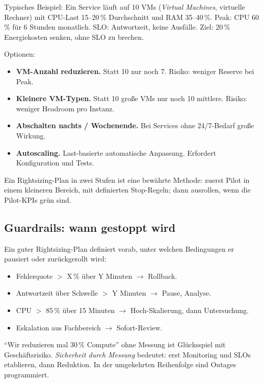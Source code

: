 \documentclass[11pt,a4paper,oneside]{article}
\begin{document}
Typisches Beispiel: Ein Service läuft auf 10 VMs (\emph{Virtual Machines}, virtuelle Rechner) mit CPU-Last 15--20\,\% Durchschnitt und RAM 35--40\,\%. Peak: CPU 60\,\% für 6 Stunden monatlich. SLO: Antwortzeit, keine Ausfälle. Ziel: 20\,\% Energiekosten senken, ohne SLO zu brechen.

Optionen:

\begin{itemize}
  \item \textbf{VM-Anzahl reduzieren.} Statt 10 nur noch 7. Risiko: weniger Reserve bei Peak.
  \item \textbf{Kleinere VM-Typen.} Statt 10 große VMs nur noch 10 mittlere. Risiko: weniger Headroom pro Instanz.
  \item \textbf{Abschalten nachts / Wochenende.} Bei Services ohne 24/7-Bedarf große Wirkung.
  \item \textbf{Autoscaling.} Last-basierte automatische Anpassung. Erfordert Konfiguration und Tests.
\end{itemize}

Ein Rightsizing-Plan in zwei Stufen ist eine bewährte Methode: zuerst Pilot in einem kleineren Bereich, mit definierten Stop-Regeln; dann ausrollen, wenn die Pilot-KPIs grün sind.

\subsection{Guardrails: wann gestoppt wird}

Ein guter Rightsizing-Plan definiert vorab, unter welchen Bedingungen er pausiert oder zurückgerollt wird:

\begin{itemize}
  \item Fehlerquote $>$ X\,\% über Y Minuten $\to$ Rollback.
  \item Antwortzeit über Schwelle $>$ Y Minuten $\to$ Pause, Analyse.
  \item CPU $>$ 85\,\% über 15 Minuten $\to$ Hoch-Skalierung, dann Untersuchung.
  \item Eskalation aus Fachbereich $\to$ Sofort-Review.
\end{itemize}

\begin{merkbox}
``Wir reduzieren mal 30\,\% Compute'' ohne Messung ist Glücksspiel mit Geschäftsrisiko. \emph{Sicherheit durch Messung} bedeutet: erst Monitoring und SLOs etablieren, dann Reduktion. In der umgekehrten Reihenfolge sind Outages programmiert.
\end{merkbox}
\end{document}
